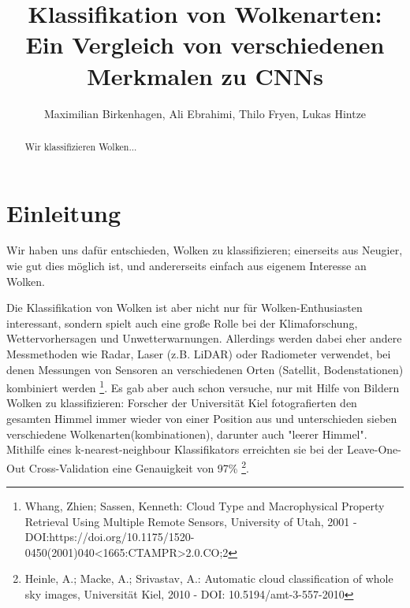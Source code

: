 \documentclass[a4,german]{article}
\begin{document}
\title{Klassifikation von Wolkenarten: Ein Vergleich von verschiedenen Merkmalen zu CNNs} %
\author{Maximilian Birkenhagen, Ali Ebrahimi, Thilo Fryen, Lukas Hintze} %
\maketitle %


\begin{abstract}
    Wir klassifizieren Wolken...
\end{abstract}

\newpage
\section{Einleitung}


Wir haben uns dafür entschieden, Wolken zu klassifizieren; einerseits aus Neugier, wie gut dies möglich ist, und andererseits einfach aus eigenem Interesse an Wolken.

 Die Klassifikation von Wolken ist aber nicht nur für Wolken-Enthusiasten interessant, sondern spielt auch eine große Rolle bei der Klimaforschung, Wettervorhersagen und Unwetterwarnungen. Allerdings werden dabei eher andere Messmethoden wie Radar, Laser (z.B. LiDAR) oder Radiometer verwendet, bei denen Messungen von Sensoren an verschiedenen Orten (Satellit, Bodenstationen) kombiniert werden \footnote{Whang, Zhien; Sassen, Kenneth: Cloud Type and Macrophysical Property Retrieval Using Multiple Remote Sensors, University of Utah, 2001 - DOI:https://doi.org/10.1175/1520-0450(2001)040<1665:CTAMPR>2.0.CO;2}. Es gab aber auch schon versuche, nur mit Hilfe von Bildern Wolken zu klassifizieren: Forscher der Universität Kiel fotografierten den gesamten Himmel immer wieder von einer Position aus und unterschieden sieben verschiedene Wolkenarten(kombinationen), darunter auch "leerer Himmel". Mithilfe eines k-nearest-neighbour Klassifikators erreichten sie bei der Leave-One-Out Cross-Validation eine Genauigkeit von 97\% \footnote{Heinle, A.; Macke, A.; Srivastav, A.: Automatic cloud classification of whole sky images, Universität Kiel, 2010 - DOI: 10.5194/amt-3-557-2010}.
\end{document}
